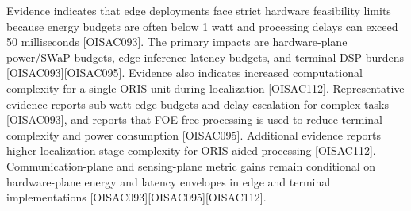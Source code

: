 {}\markdownRendererOlBegin
{} Evidence indicates that edge deployments face strict hardware feasibility limits because energy budgets are often below 1 watt and processing delays can exceed 50 milliseconds [O\markdownRendererUnderscore{}ISAC\markdownRendererUnderscore{}093].\markdownRendererOlItemEnd 
{} The primary impacts are hardware-plane power/SWaP budgets, edge inference latency budgets, and terminal DSP burdens [O\markdownRendererUnderscore{}ISAC\markdownRendererUnderscore{}093][O\markdownRendererUnderscore{}ISAC\markdownRendererUnderscore{}095]. Evidence also indicates increased computational complexity for a single ORIS unit during localization [O\markdownRendererUnderscore{}ISAC\markdownRendererUnderscore{}112].\markdownRendererOlItemEnd 
{} Representative evidence reports sub-watt edge budgets and delay escalation for complex tasks [O\markdownRendererUnderscore{}ISAC\markdownRendererUnderscore{}093], and reports that FOE-free processing is used to reduce terminal complexity and power consumption [O\markdownRendererUnderscore{}ISAC\markdownRendererUnderscore{}095]. Additional evidence reports higher localization-stage complexity for ORIS-aided processing [O\markdownRendererUnderscore{}ISAC\markdownRendererUnderscore{}112].\markdownRendererOlItemEnd 
{} Communication-plane and sensing-plane metric gains remain conditional on hardware-plane energy and latency envelopes in edge and terminal implementations [O\markdownRendererUnderscore{}ISAC\markdownRendererUnderscore{}093][O\markdownRendererUnderscore{}ISAC\markdownRendererUnderscore{}095][O\markdownRendererUnderscore{}ISAC\markdownRendererUnderscore{}112].\markdownRendererOlItemEnd 
